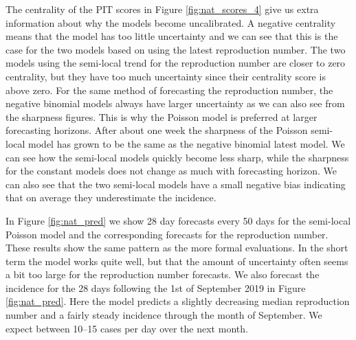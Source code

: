 \documentclass[12pt]{article}
\begin{document}
The centrality of the PIT scores in Figure \ref{fig:nat_scores_4} give us extra information about why the models become uncalibrated. A negative centrality means that the model has too little uncertainty and we can see that this is the case for the two models based on using the latest reproduction number. The two models using the semi-local trend for the reproduction number are closer to zero centrality, but they have too much uncertainty since their centrality score is above zero. For the same method of forecasting the reproduction number, the negative binomial models always have larger uncertainty as we can also see from the sharpness figures. This is why the Poisson model is preferred at larger forecasting horizons. After about one week the sharpness of the Poisson semi-local model has grown to be the same as the negative binomial latest model. We can see how the semi-local models quickly become less sharp, while the sharpness for the constant models does not change as much with forecasting horizon.  We can also see that the two semi-local models have a small negative bias indicating that on average they underestimate the incidence.

In Figure \ref{fig:nat_pred} we show 28 day forecasts every 50 days for the semi-local Poisson model and the corresponding forecasts for the reproduction number. These results show the same pattern as the more formal evaluations. In the short term the model works quite well, but that the amount of uncertainty often seems a bit too large for the reproduction number forecasts. We also forecast the incidence for the 28 days following the 1st of September 2019 in Figure \ref{fig:nat_pred}. Here the model predicts a slightly decreasing median reproduction number and a fairly steady incidence through the month of September. We expect between 10--15 cases per day over the next month. 
\end{document}

